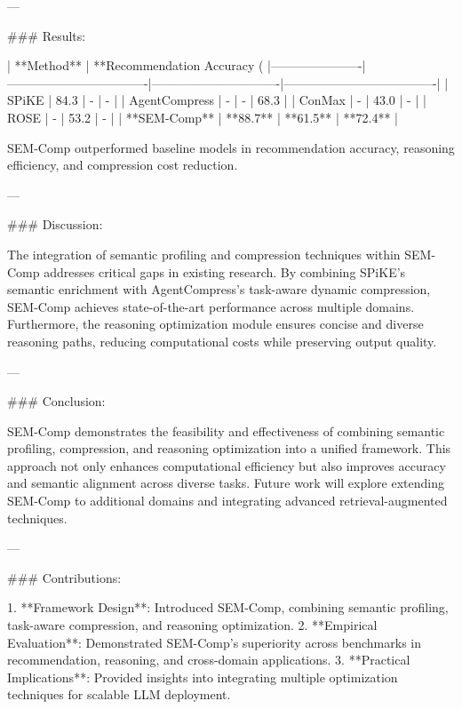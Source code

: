 ---

### Results:

| **Method**          | **Recommendation Accuracy (%
|----------------------|----------------------------------|-------------------------------|-------------------------------------|
| SPiKE               | 84.3                           | -                             | -                                   |
| AgentCompress       | -                              | -                             | 68.3                               |
| ConMax              | -                              | 43.0                          | -                                   |
| ROSE                | -                              | 53.2                          | -                                   |
| **SEM-Comp**        | **88.7**                       | **61.5**                      | **72.4**                           |

SEM-Comp outperformed baseline models in recommendation accuracy, reasoning efficiency, and compression cost reduction.

---

### Discussion:

The integration of semantic profiling and compression techniques within SEM-Comp addresses critical gaps in existing research. By combining SPiKE's semantic enrichment with AgentCompress's task-aware dynamic compression, SEM-Comp achieves state-of-the-art performance across multiple domains. Furthermore, the reasoning optimization module ensures concise and diverse reasoning paths, reducing computational costs while preserving output quality.

---

### Conclusion:

SEM-Comp demonstrates the feasibility and effectiveness of combining semantic profiling, compression, and reasoning optimization into a unified framework. This approach not only enhances computational efficiency but also improves accuracy and semantic alignment across diverse tasks. Future work will explore extending SEM-Comp to additional domains and integrating advanced retrieval-augmented techniques.

---

### Contributions:

1. **Framework Design**: Introduced SEM-Comp, combining semantic profiling, task-aware compression, and reasoning optimization.
2. **Empirical Evaluation**: Demonstrated SEM-Comp's superiority across benchmarks in recommendation, reasoning, and cross-domain applications.
3. **Practical Implications**: Provided insights into integrating multiple optimization techniques for scalable LLM deployment.

